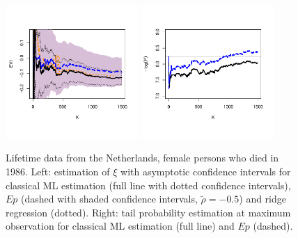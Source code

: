 \documentclass[twoside,leqno,11pt]{article}
\begin{document}
\begin{figure}[!ht]
  \centering
\includegraphics[width=0.45\textwidth]{lifetime_evi_with_GPD_conf.pdf} 
\includegraphics[width=0.45\textwidth]{lifetime_prob.pdf} 
  \caption{Lifetime data from the Netherlands, female persons who died in 1986. Left: estimation of $\xi$ with asymptotic confidence intervals for classical ML estimation (full line with dotted confidence intervals), $Ep$ (dashed with shaded confidence intervals, $\tilde\rho=-0.5$) and ridge regression (dotted). Right: tail probability estimation at maximum observation for classical ML estimation (full line) and  $Ep$ (dashed). }
\end{figure} 
 
\end{document}
